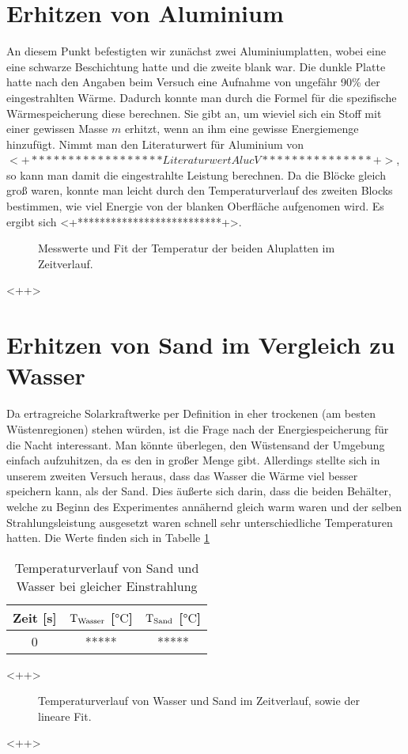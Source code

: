 \documentclass[12pt,a4paper,titlepage,headinclude,bibtotoc]{scrartcl}
\begin{document}
\section{Erhitzen von Aluminium}
An diesem Punkt befestigten wir zunächst zwei Aluminiumplatten, wobei eine eine schwarze Beschichtung hatte und die zweite blank war.
Die dunkle Platte hatte nach den Angaben beim Versuch eine Aufnahme von ungefähr 90\% der eingestrahlten Wärme.
Dadurch konnte man durch die Formel für die spezifische Wärmespeicherung diese berechnen.
Sie gibt an, um wieviel sich ein Stoff mit einer gewissen Masse $m$ erhitzt, wenn an ihm eine gewisse Energiemenge hinzufügt.
Nimmt man den Literaturwert für Aluminium von $<+******************Literaturwert Alu cV***************+>$, so kann man damit die eingestrahlte Leistung berechnen.
Da die Blöcke gleich groß waren, konnte man leicht durch den Temperaturverlauf des zweiten Blocks bestimmen, wie viel Energie von der blanken Oberfläche aufgenomen wird.
Es ergibt sich <+**************************+>.

\begin{figure}[h]
	\centering
	
	\caption{Messwerte und Fit der Temperatur der beiden Aluplatten im Zeitverlauf.}
	\label{fig:<+label+>}
\end{figure}<++>


\section{Erhitzen von Sand im Vergleich zu Wasser}
Da ertragreiche Solarkraftwerke per Definition in eher trockenen (am besten Wüstenregionen) stehen würden, ist die Frage nach der Energiespeicherung für die Nacht interessant.
Man könnte überlegen, den Wüstensand der Umgebung einfach aufzuhitzen, da es den in großer Menge gibt.
Allerdings stellte sich in unserem zweiten Versuch heraus, dass das Wasser die Wärme viel besser speichern kann, als der Sand.
Dies äußerte sich darin, dass die beiden Behälter, welche zu Beginn des Experimentes annähernd gleich warm waren und der selben Strahlungsleistung ausgesetzt waren schnell sehr unterschiedliche Temperaturen hatten.
Die Werte finden sich in Tabelle \ref{tab:wassersand}

\begin{table}
	\centering
	\begin{tabular}{|c|c|c|}
		\hline Zeit [s]	& $\text T_\text{Wasser}$ [$\si\celsius$] & $\text T_\text{Sand}$ [$\si\celsius$] \\\hline\hline
		0	& *****	& *****\\\hline
	\end{tabular}
	\caption{Temperaturverlauf von Sand und Wasser bei gleicher Einstrahlung}
	\label{tab:wassersand}
\end{table}<++>

\begin{figure}[h]
	\centering
	
	\caption{Temperaturverlauf von Wasser und Sand im Zeitverlauf, sowie der lineare Fit.}
	\label{fig:<+label+>}
\end{figure}<++>
\end{document}
